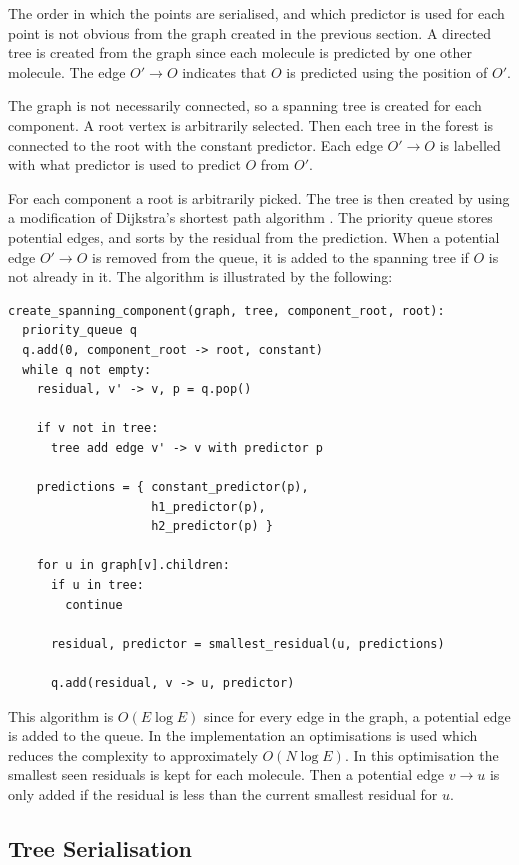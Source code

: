 \documentclass[a4paper]{report}
\begin{document}
The order in which the points are serialised, and which predictor is used for
each point is not obvious from the graph created in the previous section. A
directed tree is created from the graph since each molecule is predicted by
one other molecule. The edge $O' \to O$ indicates that $O$ is predicted using
the position of $O'$.

The graph is not necessarily connected, so a spanning tree is created for each
component. A root vertex is arbitrarily selected. Then each tree in the forest
is connected to the root with the constant predictor. Each edge $O' \to O$ is
labelled with what predictor is used to predict $O$ from $O'$.

For each component a root is arbitrarily picked. The tree is then created by
using a modification of Dijkstra's shortest path algorithm
\citep{dijkstra1959note}. The priority queue stores potential edges, and sorts
by the residual from the prediction. When a potential edge $O' \to O$ is
removed from the queue, it is added to the spanning tree if $O$ is not already
in it. The algorithm is illustrated by the following:

\begin{verbatim}
create_spanning_component(graph, tree, component_root, root):
  priority_queue q
  q.add(0, component_root -> root, constant)
  while q not empty:
    residual, v' -> v, p = q.pop()

    if v not in tree:
      tree add edge v' -> v with predictor p

    predictions = { constant_predictor(p),
                    h1_predictor(p),
                    h2_predictor(p) }

    for u in graph[v].children:
      if u in tree:
        continue

      residual, predictor = smallest_residual(u, predictions)

      q.add(residual, v -> u, predictor)
\end{verbatim}

This algorithm is $O(E \log E)$ since for every edge in the graph, a potential
edge is added to the queue. In the implementation an optimisations is used
which reduces the complexity to approximately $O(N \log E)$. In this
optimisation the smallest seen residuals is kept for each molecule. Then a
potential edge $v \to u$ is only added if the residual is less than the
current smallest residual for $u$.


\subsection{Tree Serialisation}
\end{document}
